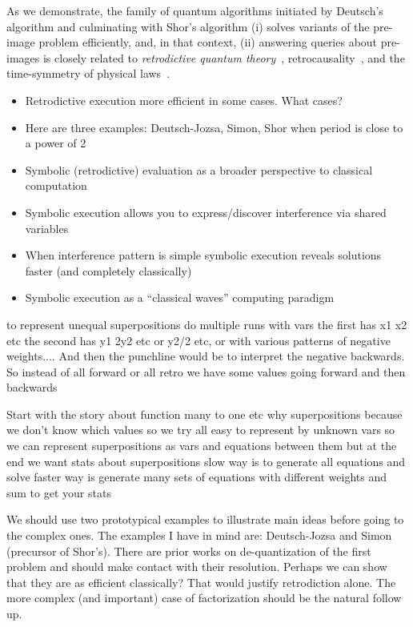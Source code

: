 \documentclass{article}
\begin{document}
As we demonstrate, the family of quantum algorithms initiated by
Deutsch's algorithm and culminating with Shor's algorithm (i) solves
variants of the pre-image problem efficiently, and, in that context,
(ii) answering queries about pre-images is closely related to
\emph{retrodictive quantum theory}~\cite{sym13040586},
retrocausality~\cite{Aharonov2008}, and the time-symmetry of physical
laws~\cite{RevModPhys.27.179}.


\begin{itemize}
\item Retrodictive execution more efficient in some cases. What cases?
\item Here are three examples: Deutsch-Jozsa, Simon, Shor when period
  is close to a power of 2
\item Symbolic (retrodictive) evaluation as a broader perspective to classical computation
\item Symbolic execution allows you to express/discover interference via shared variables
\item When interference pattern is simple symbolic execution reveals
  solutions faster (and completely classically)
\item Symbolic execution as a “classical waves” computing paradigm
\end{itemize}


to represent unequal superpositions do multiple runs with vars the
first has x1 x2 etc the second has y1 2y2 etc or y2/2 etc, or with
various patterns of negative weights.... And then the punchline would
be to interpret the negative backwards. So instead of all forward or
all retro we have some values going forward and then backwards

Start with the story about function many to one etc why superpositions
because we don’t know which values so we try all easy to represent by
unknown vars so we can represent superpositions as vars and equations
between them but at the end we want stats about superpositions slow
way is to generate all equations and solve faster way is generate many
sets of equations with different weights and sum to get your stats



We should use two prototypical examples to illustrate main ideas
before going to the complex ones. The examples I have in mind are:
Deutsch-Jozsa and Simon (precursor of Shor's). There are prior works
on de-quantization of the first problem and should make contact with
their resolution. Perhaps we can show that they are as efficient
classically? That would justify retrodiction alone. The more complex
(and important) case of factorization should be the natural follow up.
\end{document}
